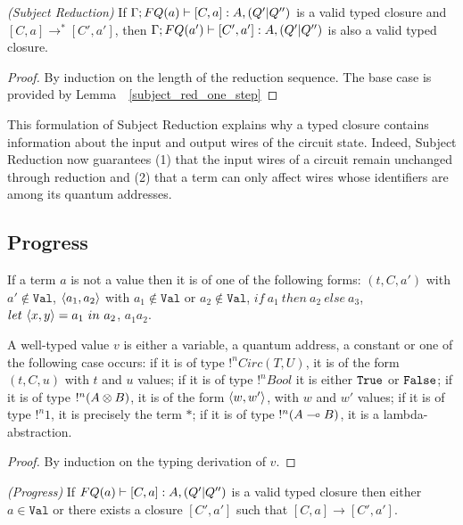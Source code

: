 \documentclass{article}
\begin{document}
\begin{corollary}
\emph{(Subject Reduction)}
If $\Gamma;FQ(a)\vdash [C,a]:A,(Q'|Q'')$ is a valid typed closure 
and $[C,a]\to^* [C',a']$, then $\Gamma;FQ(a')\vdash [C',a']:A,(Q'|Q'')$ 
is also a valid typed closure.
\end{corollary}

\begin{proof}
By induction on the length of the reduction sequence. The base case is 
provided by Lemma~~\hyperref[subject_red_one_step]{\ref*{subject_red_one_step}}
\end{proof}

This formulation of Subject Reduction explains why a typed closure contains 
information about the input and output wires of the circuit state. Indeed, 
Subject Reduction now guarantees (1) that the input wires of a circuit 
remain unchanged through reduction and (2) that a term can only affect 
wires whose identifiers are among its quantum addresses.

\subsection{Progress}

\begin{lemma}
\label{non_values}
If a term $a$ is not a value then it is of one 
of the following forms: $(t,C,a')$ with $a'\notin \mathtt{Val}$, 
$\langle a_1,a_2\rangle$ with $a_1\notin \mathtt{Val}$ or $a_2\notin \mathtt{Val}$, 
$if ~a_1~ then ~a_2~ else ~a_3$, $let ~\langle x,y\rangle=a_1~ in ~a_2$, $a_1a_2$.
\end{lemma}

\begin{lemma}
\label{form_values}
A well-typed value $v$ is either a variable, a quantum address, a constant or one 
of the following case occurs: if it is of type $!^nCirc(T,U)$, it is of the 
form $(t,C,u)$ with $t$ and $u$ values; if it is of type $!^nBool$ it is either 
$\texttt{True}$ or $\texttt{False}$; if it is of type $!^n (A\otimes B)$, it is of the
form $\langle w,w'\rangle$, with $w$ and $w'$ values; if it is of type $!^n1$, it is 
precisely the term $*$; if it is of type $!^n (A\multimap B)$, it is a 
lambda-abstraction.
\end{lemma}

\begin{proof}
By induction on the typing derivation of $v$.
\end{proof}

\begin{proposition}
\emph{(Progress)}
If $FQ(a)\vdash [C,a]:A,(Q'|Q'')$ is a valid typed closure then either 
$a\in\mathtt{Val}$ or there exists a closure $[C',a']$ such that 
$[C,a]\to [C',a']$.
\end{proposition}
\end{document}
